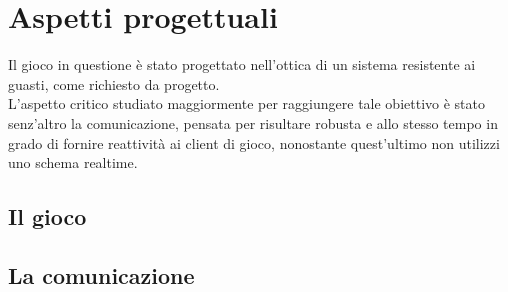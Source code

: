 \section{Aspetti progettuali}
Il gioco in questione è stato progettato nell'ottica di un sistema
resistente ai guasti, come richiesto da progetto.\\
L'aspetto critico studiato maggiormente per raggiungere tale
obiettivo è stato 
senz'altro la comunicazione, pensata per
risultare robusta e allo stesso tempo in grado di fornire reattività ai
client di gioco, nonostante quest'ultimo non utilizzi uno schema
realtime.

\subsection{Il gioco}

\subsection{La comunicazione}
